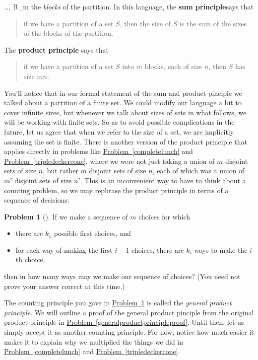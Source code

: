 \documentclass[10pt,]{book}
\newcommand{\terminology}[1]{\textbf{#1}}
\theoremstyle{plain}
\theoremstyle{definition}
\newtheorem{activity}[project]{Problem}
\theoremstyle{definition}
\numberwithin{equation}{chapter}
\begin{document}
\ldots, B_m\) the \emph{blocks} of the partition. In this language, the \terminology{sum principle}says that%
\begin{quote}\hypertarget{blockquote-1}{}
if we have a partition of a set \(S\), then the size of \(S\) is the sum of the sizes of the blocks of the partition.%
\end{quote}
The \terminology{product principle} says that%
\begin{quote}\hypertarget{blockquote-2}{}
if we have a partition of a set \(S\) into \(m\) blocks, each of size \(n\), then \(S\) has size \(mn\).%
\end{quote}
You'll notice that in our formal statement of the sum and product pinciple we talked about a partition of a finite set. We could modify our language a bit to cover infinite sizes, but whenever we talk about sizes of sets in what follows, we will be working with finite sets. So as to avoid possible complications in the future, let us agree that when we refer to the size of a set, we are implicitly assuming the set is finite. There is another version of the product principle that applies directly in problems like \hyperref[completelunch]{Problem~\ref{completelunch}} and \hyperref[tripledeckercone]{Problem~\ref{tripledeckercone}}, where we were not just taking a union of \(m\) disjoint sets of size \(n\), but rather \(m\) disjoint sets of size \(n\), each of which was a union of \(m'\) disjoint sets of size \(n'\). This is an inconvenient way to have to think about a counting problem, so we may rephrase the product principle in terms of a sequence of decisions:%
\begin{activity}[]\label{generalproductprincipleintro}
If we make a sequence of \(m\) choices for which \leavevmode%
\begin{itemize}[label=\textbullet]
\item{}there are \(k_1\) possible first choices, and%
\item{}for each way of making the first \(i-1\) choices, there are \(k_i\) ways to make the \(i\)th choice,%
\end{itemize}
 then in how many ways may we make our sequence of choices? (You need not prove your answer correct at this time.)%
\end{activity}
The counting principle you gave in \hyperref[generalproductprincipleintro]{Problem~\ref{generalproductprincipleintro}} is called the \emph{general product principle}. We will outline a proof of the general product pinciple from the original product principle in \hyperref[generalproductprincipleproof]{Problem~\ref{generalproductprincipleproof}}. Until then, let us simply accept it as another counting principle. For now, notice how much easier it makes it to explain why we multiplied the things we did in \hyperref[completelunch]{Problem~\ref{completelunch}} and \hyperref[tripledeckercone]{Problem~\ref{tripledeckercone}}.%
\end{document}
